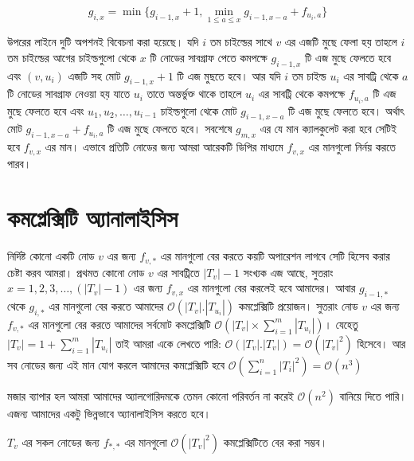 \[g_{i, x} = \min \lbrace g_{i - 1, x} + 1, \min_{1 \leq a \leq x} g_{i - 1, x - a} + f_{u_{i}, a} \rbrace\]

উপরের লাইনে দুটি অপশনই বিবেচনা করা হয়েছে। যদি \(i\) তম চাইল্ডের সাথে \(v\) এর এজটি মুছে ফেলা হয় তাহলে \(i\) তম চাইল্ডের আগের চাইল্ডগুলো থেকে \(x\) টি নোডের সাবগ্রাফ পেতে কমপক্ষে \(g_{i - 1, x}\) টি এজ মুছে ফেলতে হবে এবং \(\left ( v, u_{i}\right ) \) এজটি সহ মোট \(g_{i - 1, x} + 1\) টি এজ মুছতে হবে। আর যদি \(i\) তম চাইল্ড \(u_{i}\) এর সাবট্রি থেকে \(a\) টি নোডের সাবগ্রাফ নেওয়া হয় যাতে \(u_{i}\) তাতে অন্তর্ভুক্ত থাকে তাহলে \(u_{i}\) এর সাবট্রি থেকে কমপক্ষে \(f_{u_{i}, a}\) টি এজ মুছে ফেলতে হবে এবং \(u_{1}, u_{2}, \dots , u_{i - 1}\) চাইল্ডগুলো থেকে মোট \(g_{i - 1, x - a}\) টি এজ মুছে ফেলতে হবে। অর্থাৎ মোট \(g_{i - 1, x - a} + f_{u_{i}, a}\) টি এজ মুছে ফেলতে হবে। সবশেষে \(g_{m, x}\) এর যে মান ক্যালকুলেট করা হবে সেটিই হবে \(f_{v, x}\) এর মান। এভাবে প্রতিটি নোডের জন্য আমরা আরেকটি ডিপির মাধ্যমে \(f_{v, x}\) এর মানগুলো নির্নয় করতে পারব। 

\section{কমপ্লেক্সিটি অ্যানালাইসিস}
নির্দিষ্ট কোনো একটি নোড \(v\) এর জন্য \(f_{v, *}\) এর মানগুলো বের করতে কয়টি অপারেশন লাগবে সেটি হিসেব করার চেষ্টা করব আমরা। প্রথমত কোনো নোড \(v\) এর সাবট্রিতে \(|T_{v}| - 1\) সংখ্যক এজ আছে, সুতরাং \(x = 1, 2, 3, \dots , (|T_{v}| - 1)\) এর জন্য \(f_{v, x}\) এর মানগুলো বের করলেই হবে আমাদের। আবার \(g_{i - 1, *}\) থেকে \(g_{i, *}\) এর মানগুলো বের করতে আমাদের \(\mathcal{O} \left (|T_{v}| . |T_{u_{i}}| \right )\) কমপ্লেক্সিটি প্রয়োজন। সুতরাং নোড \(v\) এর জন্য \(f_{v, *}\) এর মানগুলো বের করতে আমাদের সর্বমোট কমপ্লেক্সিটি \(\mathcal{O} \left (|T_{v}| \times \sum_{i = 1}^{m} |T_{u_{i}}| \right )\)। যেহেতু \(|T_{v}| = 1 + \sum_{i = 1}^{m} |T_{u_{i}}|\) তাই আমরা একে লেখতে পারি: \(\mathcal{O} \left (|T_{v}| . |T_{v}| \right ) = \mathcal{O} \left (|T_{v}|^{2} \right ) \) হিসেবে। আর সব নোডের জন্য এই মান যোগ করলে আমাদের কমপ্লেক্সিটি হবে \(\mathcal{O} \left ( \sum_{i = 1}^{n} |T_{i}|^{2} \right ) = \mathcal{O} \left ( n^{3} \right ) \)

মজার ব্যাপার হল আমরা আমাদের অ্যালগোরিদমকে তেমন কোনো পরিবর্তন না করেই \(\mathcal{O} (n^{2})\) বানিয়ে দিতে পারি। এজন্য আমাদের একটু ভিন্নভাবে অ্যানালাইসিস করতে হবে।

\begin{lemma} 
\(T_{v}\) এর সকল নোডের জন্য \(f_{*, *}\) এর মানগুলো \(\mathcal{O} \left ( |T_{v}|^{2} \right )\) কমপ্লেক্সিটিতে বের করা সম্ভব। 
\end{lemma}

